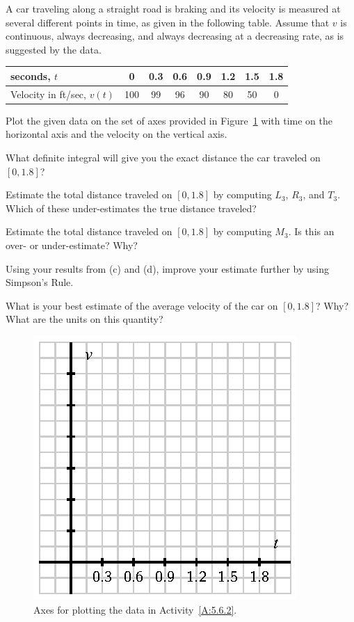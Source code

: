 \begin{activity} \label{A:5.6.2}  A car traveling along a straight road is braking and its velocity is measured at several different points in time, as given in the following table.  Assume that $v$ is continuous, always decreasing, and always decreasing at a decreasing rate, as is suggested by the data.
\begin{center}
\begin{tabular}{|l|c|c|c|c|c|c|c|}
\hline
seconds, $t$ & 0 & 0.3 & 0.6 & 0.9 & 1.2 & 1.5 & 1.8 \\
\hline
Velocity in ft/sec, $v(t)$ & 100 & 99 & 96 & 90 & 80 & 50 & 0 \\
\hline
\end{tabular}
\end{center}
\ba
	\item Plot the given data on the set of axes provided in Figure~\ref{F:5.6.Act2} with time on the horizontal axis and the velocity on the vertical axis.
	\item What definite integral will give you the exact distance the car traveled on $[0,1.8]$?
	\item Estimate the total distance traveled on $[0,1.8]$ by computing $L_3$, $R_3$, and $T_3$.  Which of these under-estimates the true distance traveled?
	\item Estimate the total distance traveled on $[0,1.8]$ by computing $M_3$.  Is this an over- or under-estimate?  Why?
	\item Using your results from (c) and (d), improve your estimate further by using Simpson's Rule.
	\item What is your best estimate of the average velocity of the car on $[0,1.8]$?  Why?  What are the units on this quantity?
\ea
\begin{figure}[h]
\begin{center}
\includegraphics{figures/5_6_Act2.eps}
\caption{Axes for plotting the data in Activity~\ref{A:5.6.2}.} 
\label{F:5.6.Act2}
\end{center}
\end{figure}
\end{activity}
